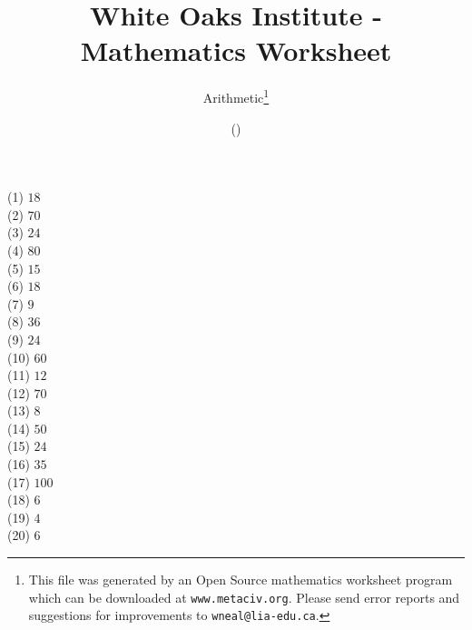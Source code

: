\documentclass[letter]{article}
\begin{document}
\title{White Oaks Institute - Mathematics Worksheet}
\author{Arithmetic\thanks{This file was generated by an \textsf{Open Source} mathematics worksheet program which can be downloaded at \texttt{www.metaciv.org}. Please send error reports and suggestions for improvements to \texttt{wneal@lia-edu.ca}.}}
\date{\XCfileversion{} (\XCfiledate)}
\maketitle
\setlength{\parskip}{12mm plus 4mm minus 4mm}\setlength{\parindent}{0cm}\begin{multicols}{2}(1) $18$\\(2) $70$\\(3) $24$\\(4) $80$\\(5) $15$\\(6) $18$\\(7) $9$\\(8) $36$\\(9) $24$\\(10) $60$\\(11) $12$\\(12) $70$\\(13) $8$\\(14) $50$\\(15) $24$\\(16) $35$\\(17) $100$\\(18) $6$\\(19) $4$\\(20) $6$\\\end{multicols}
\end{document}
